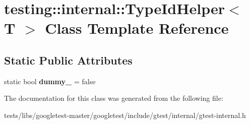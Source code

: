 \hypertarget{classtesting_1_1internal_1_1TypeIdHelper}{}\section{testing\+:\+:internal\+:\+:Type\+Id\+Helper$<$ T $>$ Class Template Reference}
\label{classtesting_1_1internal_1_1TypeIdHelper}
\subsection*{Static Public Attributes}
\begin{DoxyCompactItemize}
\item 
\mbox{\label{classtesting_1_1internal_1_1TypeIdHelper_a372268b1520d965d0bdf01ebad3d270e}} 
static bool {\bfseries dummy\+\_\+} = false
\end{DoxyCompactItemize}


The documentation for this class was generated from the following file\+:\begin{DoxyCompactItemize}
\item 
tests/libs/googletest-\/master/googletest/include/gtest/internal/gtest-\/internal.\+h\end{DoxyCompactItemize}
